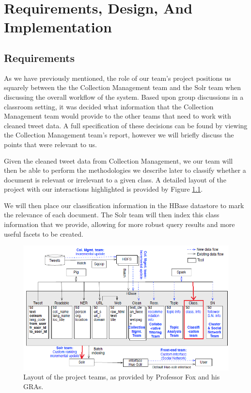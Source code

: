 \chapter[Requirements, Design, and Implementation]{Requirements, Design, And\\ Implementation}\label{ch:ReqDesignImp}
\section{Requirements}
As we have previously mentioned, the role of our team's project positions us squarely between the the Collection Management team and the Solr team when discussing the overall workflow of the system. Based upon group discussions in a classroom setting, it was decided what information that the Collection Management team would provide to the other teams that need to work with cleaned tweet data. A full specification of these decisions can be found by viewing the Collection Management team's report, however we will briefly discuss the points that were relevant to us.

Given the cleaned tweet data from Collection Management, we our team will then be able to perform the methodologies we describe later to classify whether a document is relevant or irrelevant to a given class. A detailed layout of the project with our interactions highlighted is provided by Figure \ref{fig:design}.

We will then place our classification information in the HBase datastore to mark the relevance of each document. The Solr team will then index this class information that we provide, allowing for more robust query results and more useful facets to be created.

\begin{figure}[ht]
	\centering
	\includegraphics[width=\textwidth]{figures/data_flow.png}
    \caption{Layout of the project teams, as provided by Professor Fox and his GRAs.}\label{fig:design}
\end{figure}

